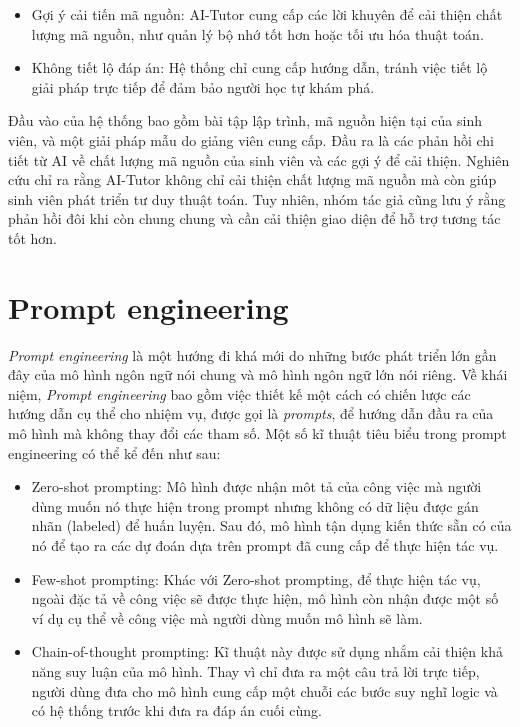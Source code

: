 \begin{itemize}
\begin{itemize}
        \item Gợi ý cải tiến mã nguồn: AI-Tutor cung cấp các lời khuyên để cải thiện chất lượng mã nguồn, như quản lý bộ nhớ tốt hơn hoặc tối ưu hóa thuật toán.
        \item Không tiết lộ đáp án: Hệ thống chỉ cung cấp hướng dẫn, tránh việc tiết lộ giải pháp trực tiếp để đảm bảo người học tự khám phá.
    \end{itemize}
    Đầu vào của hệ thống bao gồm bài tập lập trình, mã nguồn hiện tại của sinh viên, và một giải pháp mẫu do giảng viên cung cấp. Đầu ra là các phản hồi chi tiết từ AI về chất lượng mã nguồn của sinh viên và các gợi ý để cải thiện. Nghiên cứu chỉ ra rằng AI-Tutor không chỉ cải thiện chất lượng mã nguồn mà còn giúp sinh viên phát triển tư duy thuật toán. Tuy nhiên, nhóm tác giả cũng lưu ý rằng phản hồi đôi khi còn chung chung và cần cải thiện giao diện để hỗ trợ tương tác tốt hơn.
\end{itemize}
\section{Prompt engineering}
\emph{Prompt engineering} là một hướng đi khá mới do những bước phát triển lớn gần đây của mô hình ngôn ngữ nói chung và mô hình ngôn ngữ lớn nói riêng. Về khái niệm, \emph{Prompt engineering} bao gồm việc thiết kế một cách có chiến lược các hướng dẫn cụ thể cho nhiệm vụ, được gọi là \emph{prompts}, để hướng dẫn đầu ra của mô hình mà không thay đổi các tham số\cite{sahoo2024systematic}. Một số kĩ thuật tiêu biểu trong prompt engineering có thể kể đến như sau\cite{sahoo2024systematic}:
\begin{itemize}
    \item Zero-shot prompting: Mô hình được nhận môt tả của công việc mà người dùng muốn nó thực hiện trong prompt nhưng không có dữ liệu được gán nhãn (labeled) để huấn luyện. Sau đó, mô hình tận dụng kiến thức sẵn có của nó để tạo ra các dự đoán dựa trên prompt đã cung cấp để thực hiện tác vụ.
    \item Few-shot prompting: Khác với Zero-shot prompting, để thực hiện tác vụ, ngoài đặc tả về công việc sẽ được thực hiện, mô hình còn nhận được một số ví dụ cụ thể về công việc mà người dùng muốn mô hình sẽ làm.
    \item Chain-of-thought prompting\cite{DBLP:journals/corr/abs-2201-11903}: Kĩ thuật này được sử dụng nhắm cải thiện khả năng suy luận của mô hình. Thay vì chỉ đưa ra một câu trả lời trực tiếp, người dùng đưa cho mô hình cung cấp một chuỗi các bước suy nghĩ logic và có hệ thống trước khi đưa ra đáp án cuối cùng.
\end{itemize}
